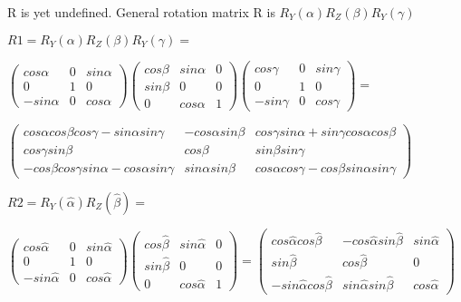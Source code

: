 \documentclass[12pt]{article}
\begin{document}
\begin{list}{()~}{}
\item 
R is yet undefined. General rotation matrix R is $R_Y(\alpha)R_Z(\beta)R_Y(\gamma)$ 
\item
$R1 = R_Y(\alpha)R_Z(\beta)R_Y(\gamma) =$

$\left( \begin{array}{ccc}
cos \alpha  & 0 & sin \alpha \\
0 & 1  & 0 \\
- sin \alpha & 0 & cos \alpha \end{array} \right)
\left( \begin{array}{ccc}
cos \beta  &  sin \alpha & 0 \\
sin \beta  &  0 & 0\\
0& cos \alpha & 1 \end{array} \right)
\left( \begin{array}{ccc}
cos \gamma  & 0 & sin \gamma \\
0 & 1  & 0 \\
- sin \gamma & 0 & cos \gamma\end{array} \right) = $

$\left( \begin{array}{ccc}
cos \alpha cos \beta cos \gamma - sin \alpha sin \gamma & - cos \alpha sin \beta & cos \gamma sin \alpha + sin \gamma cos \alpha cos \beta  \\
cos \gamma sin \beta & cos \beta & sin \beta sin \gamma \\
- cos \beta cos \gamma sin \alpha - cos \alpha sin \gamma & sin \alpha sin \beta & cos \alpha cos \gamma - cos \beta sin \alpha sin \gamma \end{array} \right)$

$R2 = R_Y(\hat{\alpha})R_Z(\hat{\beta}) =$

$\left( \begin{array}{ccc}
cos \hat{\alpha}  & 0 & sin \hat{\alpha} \\
0 & 1  & 0 \\
- sin \hat{\alpha} & 0 & cos \hat{\alpha}\end{array} \right)
\left( \begin{array}{ccc}
cos \hat{\beta}  &  sin \hat{\alpha} & 0 \\
sin \hat{\beta}  &  0 & 0\\
0& cos \hat{\alpha} & 1 \end{array} \right) = \left( \begin{array}{ccc}
cos \hat{\alpha} cos \hat{\beta} & - cos \hat{\alpha} sin \hat{\beta}  & sin \hat{\alpha} \\
sin \hat{\beta} & cos \hat{\beta} & 0 \\
- sin \hat{\alpha} cos \hat{\beta} & sin \hat{\alpha} sin \hat{\beta} & cos \hat{\alpha}\end{array} \right)$


\end{list}
\end{document}
